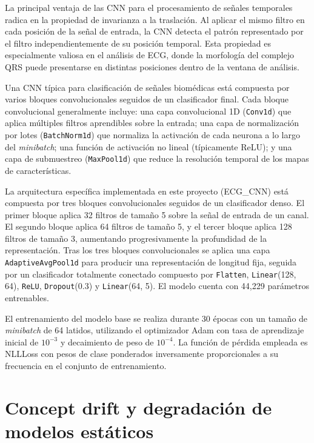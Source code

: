 La principal ventaja de las CNN para el procesamiento de señales temporales radica en la propiedad de invarianza a la traslación. Al aplicar el mismo filtro en cada posición de la señal de entrada, la CNN detecta el patrón representado por el filtro independientemente de su posición temporal. Esta propiedad es especialmente valiosa en el análisis de ECG, donde la morfología del complejo QRS puede presentarse en distintas posiciones dentro de la ventana de análisis.

Una CNN típica para clasificación de señales biomédicas está compuesta por varios bloques convolucionales seguidos de un clasificador final. Cada bloque convolucional generalmente incluye: una capa convolucional 1D (\texttt{Conv1d}) que aplica múltiples filtros aprendibles sobre la entrada; una capa de normalización por lotes (\texttt{BatchNorm1d}) que normaliza la activación de cada neurona a lo largo del \textit{minibatch}; una función de activación no lineal (típicamente ReLU); y una capa de submuestreo (\texttt{MaxPool1d}) que reduce la resolución temporal de los mapas de características.

La arquitectura específica implementada en este proyecto (ECG\_CNN) está compuesta por tres bloques convolucionales seguidos de un clasificador denso. El primer bloque aplica 32 filtros de tamaño 5 sobre la señal de entrada de un canal. El segundo bloque aplica 64 filtros de tamaño 5, y el tercer bloque aplica 128 filtros de tamaño 3, aumentando progresivamente la profundidad de la representación. Tras los tres bloques convolucionales se aplica una capa \texttt{AdaptiveAvgPool1d} para producir una representación de longitud fija, seguida por un clasificador totalmente conectado compuesto por \texttt{Flatten}, \texttt{Linear}(128, 64), \texttt{ReLU}, \texttt{Dropout}(0.3) y \texttt{Linear}(64, 5). El modelo cuenta con 44,229 parámetros entrenables.

El entrenamiento del modelo base se realiza durante 30 épocas con un tamaño de \textit{minibatch} de 64 latidos, utilizando el optimizador Adam con tasa de aprendizaje inicial de $10^{-3}$ y decaimiento de peso de $10^{-4}$. La función de pérdida empleada es NLLLoss con pesos de clase ponderados inversamente proporcionales a su frecuencia en el conjunto de entrenamiento.

\section{Concept drift y degradación de modelos estáticos}

